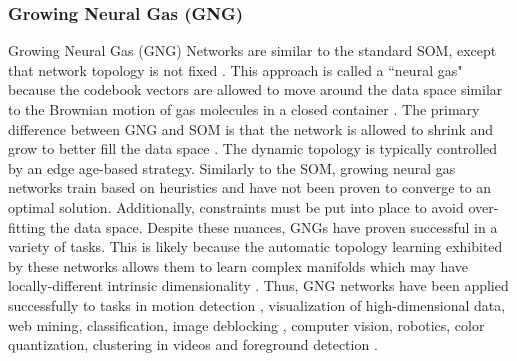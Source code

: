 \subsubsection{Growing Neural Gas (GNG)} \label{sec:GNG}
Growing Neural Gas (GNG) Networks \citep{Fritzke1995GrowingNeuralGas} are similar to the standard SOM, except that network topology is not fixed \citep{Sorzano2014DRReview}.  This approach is called a ``neural gas" because the codebook vectors are allowed to move around the data space similar to the Brownian motion of gas molecules in a closed container \citep{Pena2007NeuralGasReview}.  The primary difference between GNG and SOM is that the network is allowed to shrink and grow to better fill the data space \citep{Palomo2017GHNG,Palomo2016GrowingNeuralForest}.  The dynamic topology is typically controlled by an edge age-based strategy.  Similarly to the SOM, growing neural gas networks train based on heuristics and have not been proven to converge to an optimal solution.  Additionally, constraints must be put into place to avoid over-fitting the data space.  Despite these nuances, GNGs have proven successful in a variety of tasks.  This is likely because the automatic topology learning exhibited by these networks allows them to learn complex manifolds which may have locally-different intrinsic dimensionality \citep{Kegl2008PrincipalManifoldsTextbook}.  Thus, GNG networks have been applied successfully to tasks in motion detection \citep{Sun2016GNGMotionDetection}, visualization of high-dimensional data, web mining, classification, image deblocking \citep{LopezRubio2011GHPGraphs}, computer vision, robotics, color quantization, clustering in videos \citep{Palomo2017GHNG} and foreground detection \citep{Palomo2016GrowingNeuralForest}.

 
